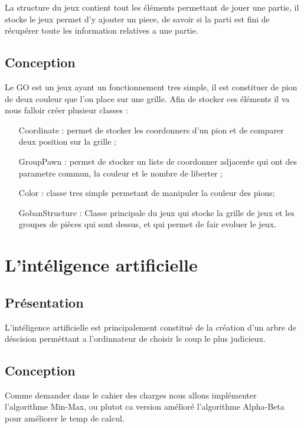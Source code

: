 		La structure du jeux contient tout les éléments permettant de jouer une partie, il stocke le jeux permet d'y ajouter un piece, de savoir si la parti est fini
		de récupérer toute les information relatives a une partie.
		
	\subsection{Conception}
	
		Le GO est un jeux ayant un fonctionnement tres simple, il est constituer de pion de deux couleur que l'on place sur une grille. Afin de stocker ces éléments
		il va nous falloir créer plusieur classes : 
			\begin{itemize}
				\item[Coordinate] : permet de stocker les coordonners d'un pion et de comparer deux position sur la grille ;
				\item[GroupPawn] : permet de stocker un liste de coordonner adjacente qui ont des parametre commun, la couleur et le nombre de liberter ;
				\item[Color] : classe tres simple permetant de manipuler la couleur des pions;
				\item[GobanStructure] : Classe principale du jeux qui stocke la grille de jeux et les groupes de pièces qui sont dessus, et qui permet de fair evoluer le jeux.
			\end{itemize}

\section{L'intéligence artificielle}

	\subsection{Présentation}
	
		L'intéligence artificielle est principalement constitué de la création d'un arbre de déscision perméttant a l'ordinnateur de choisir le coup le plus judicieux.
	
	\subsection{Conception}

		Comme demander dans le cahier des charges nous allons implémenter l'algorithme Min-Max, ou plutot ca version amélioré l'algorithme Alpha-Beta pour améliorer le temp de calcul.
		

